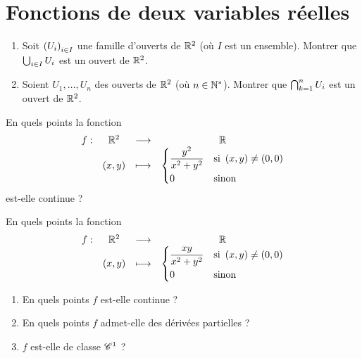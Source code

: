 \chapter{Fonctions de deux variables réelles}

\minitoc

\begin{exo}
\begin{enumerate}
    \item Soit \(\left(U_i\right)_{i\in I}\) une famille d'ouverts de \(\mathbb{R}^2\) (où \(I\) est un ensemble). Montrer que \(\bigcup_{i\in I}U_i\) est un ouvert de \(\mathbb{R}^2\). \\
    \item Soient \(U_1,\dots,U_n\) des ouverts de \(\mathbb{R}^2\) (où \(n\in\mathbb{N}^*\)). Montrer que \(\bigcap_{k=1}^n U_i\) est un ouvert de \(\mathbb{R}^2\).
\end{enumerate}
\end{exo}

\begin{exo}[Exercice 2]
En quels points la fonction \[\begin{array}[t]{cccc}f : & \mathbb{R}^2 & \longrightarrow & \mathbb{R} \\ & \left(x,y\right) & \longmapsto & \begin{dcases}
\dfrac{y^2}{x^2+y^2} &\text{si }\left(x,y\right)\not=\left(0,0\right) \\
0 &\text{sinon}
\end{dcases}\end{array}\] est-elle continue ?
\end{exo}

\begin{exo}[Exercice 3]
En quels points la fonction \[\begin{array}[t]{cccc}f : & \mathbb{R}^2 & \longrightarrow & \mathbb{R} \\ & \left(x,y\right) & \longmapsto & \begin{dcases}
\dfrac{xy}{x^2+y^2} &\text{si }\left(x,y\right)\not=\left(0,0\right) \\
0 &\text{sinon}
\end{dcases}\end{array}\]

\begin{enumerate}
    \item En quels points \(f\) est-elle continue ? \\
    \item En quels points \(f\) admet-elle des dérivées partielles ? \\
    \item \(f\) est-elle de classe \(\mathscr{C}^{1}\) ?
\end{enumerate}
\end{exo}

